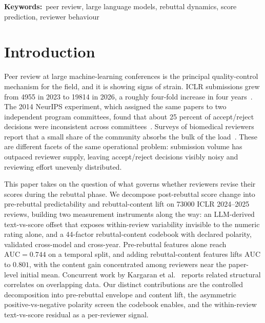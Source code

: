 \documentclass{article}
\newcommand{\auc}{\text{AUC}}
\providecommand{\keywords}[1]{%
  \vspace{0.5em}\noindent\textbf{Keywords:}\ #1\par\vspace{0.5em}%
}
\begin{document}
\keywords{peer review, large language models, rebuttal dynamics, score prediction, reviewer behaviour}

\section{Introduction}\label{sec:intro}

Peer review at large machine-learning conferences is the principal quality-control mechanism for the field, and it is showing signs of strain. ICLR submissions grew from \num{4955} in 2023 to \num{19814} in 2026, a roughly four-fold increase in four years~\cite{papercopilot}. The 2014 NeurIPS experiment, which assigned the same papers to two independent program committees, found that about 25 percent of accept/reject decisions were inconsistent across committees~\cite{cortes}. Surveys of biomedical reviewers report that a small share of the community absorbs the bulk of the load~\cite{kovanis,adam}. These are different facets of the same operational problem: submission volume has outpaced reviewer supply, leaving accept/reject decisions visibly noisy and reviewing effort unevenly distributed.

This paper takes on the question of what governs whether reviewers revise their scores during the rebuttal phase. We decompose post-rebuttal score change into pre-rebuttal predictability and rebuttal-content lift on \num{73000} ICLR 2024--2025 reviews, building two measurement instruments along the way: an LLM-derived text-vs-score offset that exposes within-review variability invisible to the numeric rating alone, and a 44-factor rebuttal-content codebook with declared polarity, validated cross-model and cross-year. Pre-rebuttal features alone reach $\auc = 0.744$ on a temporal split, and adding rebuttal-content features lifts $\auc$ to $0.801$, with the content gain concentrated among reviewers near the paper-level initial mean. Concurrent work by Kargaran et al.~\cite{kargaran} reports related structural correlates on overlapping data. Our distinct contributions are the controlled decomposition into pre-rebuttal envelope and content lift, the asymmetric positive-vs-negative polarity screen the codebook enables, and the within-review text-vs-score residual as a per-reviewer signal.
\end{document}
